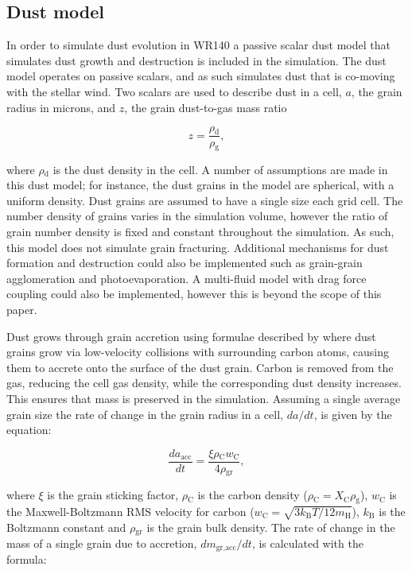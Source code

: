 \documentclass[fleqn,usenatbib]{mnras}
\newcommand{\rms}[1]{\ensuremath{_{\text{#1}}}}
\begin{document}
\subsection{Dust model}
\label{sec:dust-model}

In order to simulate dust evolution in WR140 a passive scalar dust model that simulates dust growth and destruction is included in the simulation.
The dust model operates on passive scalars, and as such simulates dust that is co-moving with the stellar wind.
Two scalars are used to describe dust in a cell, $a$, the grain radius in microns, and $z$, the grain dust-to-gas mass ratio

\begin{equation}
  z = \frac{\rho\rms{d}}{\rho\rms{g}},
\end{equation}

\noindent
where $\rho\rms{d}$ is the dust density in the cell.
A number of assumptions are made in this dust model; for instance, the dust grains in the model are spherical, with a uniform density.
Dust grains are assumed to have a single size each grid cell.
The number density of grains varies in the simulation volume, however the ratio of grain number density is fixed and constant throughout the simulation.
As such, this model does not simulate grain fracturing.
Additional mechanisms for dust formation and destruction could also be implemented such as grain-grain agglomeration and photoevaporation.
A multi-fluid model with drag force coupling could also be implemented, however this is beyond the scope of this paper.

Dust grows through grain accretion using formulae described by \cite{spitzer_jr._physical_2008} where dust grains grow via low-velocity collisions with surrounding carbon atoms, causing them to accrete onto the surface of the dust grain.
Carbon is removed from the gas, reducing the cell gas density, while the corresponding dust density increases.
This ensures that mass is preserved in the simulation.
Assuming a single average grain size the rate of change in the grain radius in a cell, $da/dt$, is given by the equation:

\begin{equation}
  \frac{da\rms{acc}}{dt} = \frac{\xi \rho\rms{C} w\rms{C}}{4\rho\rms{gr}},
\end{equation}

\noindent
where $\xi$ is the grain sticking factor, $\rho\rms{C}$ is the carbon density ($\rho\rms{C} = X\rms{C} \rho\rms{g}$), $w\rms{C}$ is the Maxwell-Boltzmann RMS velocity for carbon ($w\rms{C} = \sqrt{3k\rms{B} T / 12m\rms{H}}$), $k\rms{B}$ is the Boltzmann constant and $\rho\rms{gr}$ is the grain bulk density.
The rate of change in the mass of a single grain due to accretion, $dm\rms{gr,acc}/dt$, is calculated with the formula:
\end{document}
